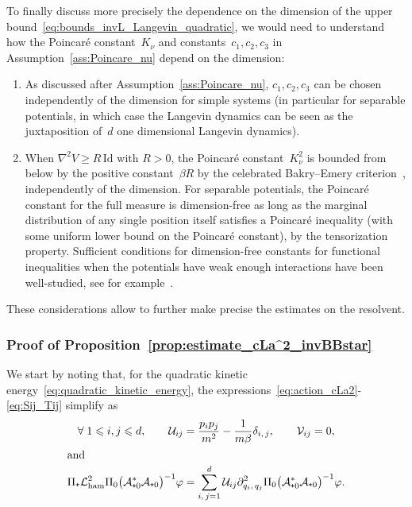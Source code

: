 \documentclass[10pt]{amsart}
\theoremstyle{definition}\newtheorem{defi}[theo]{Definition}\newtheorem{rema}[theo]{Remark}\newtheorem{exam}[theo]{Example}\newtheorem{exem}[theo]{Example}\newtheorem{nota}[theo]{Notation}
\newcommand{\Id}{\mathrm{Id}}
\newcommand{\cLa}{\mathcal{A}}
\newcommand{\cLU}{\mathcal{U}}
\newcommand{\clV}{\mathcal{V}}
\newcommand{\cLham}{\mathcal{L}_{\rm ham}}
\newcommand{\subplus}{\textnormal{\texttt{+}}}
\renewcommand{\leq}{\leqslant}
\renewcommand{\geq}{\geqslant}
\newcommand*{\romanenumi}{\renewcommand*{\theenumi}{\roman{enumi}}}
\let\oldforall\forall
\renewcommand*{\forall}{\mathrel{\oldforall}}
\begin{document}
To finally discuss more precisely the dependence on the dimension of the upper bound~\eqref{eq:bounds_invL_Langevin_quadratic}, we would need to understand how the Poincaré constant~$K_\nu$ and constants~$c_1,c_2,c_3$ in Assumption~\ref{ass:Poincare_nu} depend on the dimension:
\begin{enumerate}\romanenumi
\item As discussed after Assumption~\ref{ass:Poincare_nu}, $c_1,c_2,c_3$ can be chosen independently of the dimension for simple systems (in particular for separable potentials, in which case the Langevin dynamics can be seen as the juxtaposition of~$d$ one dimensional Langevin dynamics).
\item When $\nabla^2 V \geq R \, \Id$ with $R > 0$, the Poincaré constant~$K_\nu^2$ is bounded from below by the positive constant~$\beta R$ by the celebrated Bakry--Emery criterion~\cite{BE85}, independently of the dimension. For separable potentials, the Poincaré constant for the full measure is dimension-free as long as the marginal distribution of any single position itself satisfies a Poincaré inequality (with some uniform lower bound on the Poincaré constant), by the tensorization property. Sufficient conditions for dimension-free constants for functional inequalities when the potentials have weak enough interactions have been well-studied, see for example~\cite{otto2007,yos2001}.
\end{enumerate}
These considerations allow to further make precise the estimates on the resolvent.

\subsubsection{Proof of Proposition~\ref{prop:estimate_cLa^2_invBBstar}}\label{sec:proof_prop:estimate_cLa^2_invBBstar}

We start by noting that, for the quadratic kinetic energy~\eqref{eq:quadratic_kinetic_energy}, the expressions~\eqref{eq:action_cLa2}-\eqref{eq:Sij_Tij} simplify as
\begin{align*}
\forall 1 \leq i,j \leq d, \qquad \cLU_{ij} &= \frac{p_{i}p_{j}}{m^2} - \frac{1}{m\beta}\delta_{i,\,j}, \qquad
\clV_{ij}= 0,
\\
\intertext{and}
\Pi_\subplus \cLham^2 \Pi_0 \big(\cLa_{\subplus 0}^*\cLa_{\subplus 0}\big)^{-1} \varphi &= \sum_{i,\,j=1}^d \cLU_{ij} \partial^2_{q_i,\,q_j} \Pi_0 \big(\cLa_{\subplus 0}^*\cLa_{\subplus 0}\big)^{-1}\varphi.
\end{align*}
\end{document}
